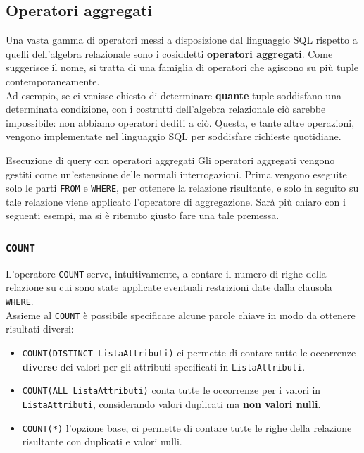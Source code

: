 \documentclass[12pt]{report}
\begin{document}
	\subsection{Operatori aggregati}
	Una vasta gamma di operatori messi a disposizione dal linguaggio SQL rispetto a quelli dell'algebra relazionale sono i cosiddetti \textbf{operatori aggregati}. Come suggerisce il nome, si tratta di una famiglia di operatori che agiscono su più tuple contemporaneamente.\\
	Ad esempio, se ci venisse chiesto di determinare \textbf{quante} tuple soddisfano una determinata condizione, con i costrutti dell'algebra relazionale ciò sarebbe impossibile: non abbiamo operatori dediti a ciò. Questa, e tante altre operazioni, vengono implementate nel linguaggio SQL per soddisfare richieste quotidiane.\\
	\begin{proposizione}{Esecuzione di query con operatori aggregati}{}
		Gli operatori aggregati vengono gestiti come un'estensione delle normali interrogazioni. Prima vengono eseguite solo le parti \texttt{FROM} e \texttt{WHERE}, per ottenere la relazione risultante, e solo in seguito su tale relazione viene applicato l'operatore di aggregazione. Sarà più chiaro con i seguenti esempi, ma si è ritenuto giusto fare una tale premessa.
	\end{proposizione}
	
	\subsubsection*{\texttt{COUNT}}
	L'operatore \texttt{COUNT} serve, intuitivamente, a contare il numero di righe della relazione su cui sono state applicate eventuali restrizioni date dalla clausola \texttt{WHERE}.\\
	Assieme al \texttt{COUNT} è possibile specificare alcune parole chiave in modo da ottenere risultati diversi:
	\begin{itemize}
		\item \texttt{COUNT(DISTINCT ListaAttributi)} ci permette di contare tutte le occorrenze \textbf{diverse} dei valori per gli attributi specificati in \texttt{ListaAttributi}.
		
		\item \texttt{COUNT(ALL ListaAttributi)} conta tutte le occorrenze per i valori in \texttt{ListaAttributi}, considerando valori duplicati ma \textbf{non valori nulli}.
		
		\item \texttt{COUNT(*)} l'opzione base, ci permette di contare tutte le righe della relazione risultante con duplicati e valori nulli.
	\end{itemize}
	
\end{document}
